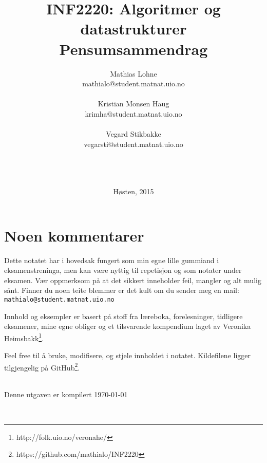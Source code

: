 \documentclass[10pt,norsk,a4paper,hidelinks]{article}
\title{\sffamily \Huge INF2220: Algoritmer og datastrukturer\\ Pensumsammendrag}
\author{\sffamily Mathias Lohne\\ \footnotesize\sffamily mathialo@student.matnat.uio.no\\~\\\sffamily Kristian Monsen Haug\\ \footnotesize\sffamily krimha@student.matnat.uio.no \\~\\ \sffamily Vegard Stikbakke \\ \footnotesize \footnotesize\sffamily vegarsti@student.matnat.uio.no}
\date{~\\~\\~\\\sffamily Høsten, 2015}
\theoremstyle{indented}
\begin{document}
\maketitle
\thispagestyle{empty}
\vfill
\newpage
{}

\section*{Noen kommentarer}
Dette notatet har i hovedsak fungert som min egne lille gummiand i eksamenstreninga, men kan være nyttig til repetisjon og som notater under eksamen. Vær oppmerksom på at det sikkert inneholder feil, mangler og alt mulig sånt. Finner du noen teite blemmer er det kult om du sender meg en mail: \verb|mathialo@student.matnat.uio.no|

Innhold og eksempler er basert på stoff fra læreboka, forelesninger, tidligere eksamener, mine egne obliger og et tilsvarende kompendium laget av Veronika Heimsbakk\footnote{http://folk.uio.no/veronahe/}.

Feel free til å bruke, modifisere, og stjele innholdet i notatet. Kildefilene ligger tilgjengelig på GitHub\footnote{https://github.com/mathialo/INF2220}.

~\\Denne utgaven er kompilert \today

~\\

\tableofcontents
\newpage

\newpage
\newpage
\newpage
\newpage

\newpage

\newpage
\newpage



\end{document}
